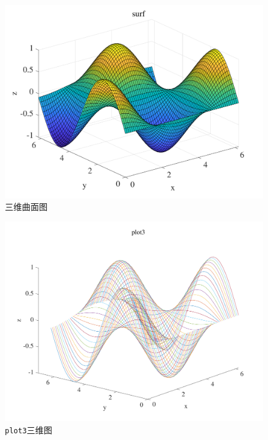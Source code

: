 \begin{figure}[!htb]
	\centering
	\includegraphics[width=0.6\linewidth]{pic/surf.pdf}
	\vspace*{-2em}
	\caption{三维曲面图}
\end{figure}
\begin{figure}[!htb]
	\centering
	\includegraphics[width=0.6\linewidth]{pic/plot3.pdf}
	\vspace*{-2em}
	\caption{\lstinline|plot3|三维图}
\end{figure}

